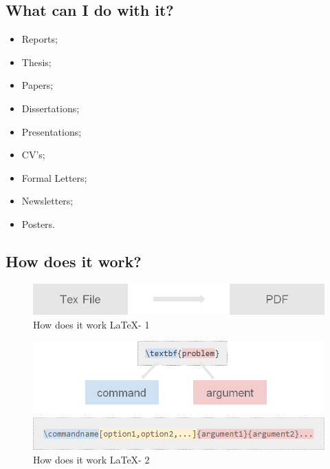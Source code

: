 \documentclass{article} %
\begin{document}
    
    \subsection{What can I do with it?}
           \begin{multicols}{2}
        \begin{itemize}
            \item Reports;
            \item Thesis;
            \item Papers; 
            \item Dissertations;
            \item Presentations;
            \item CV's;
            \item Formal Letters;
            \item Newsletters;
            \item Posters. 
        \end{itemize} 
        \end{multicols}
    
        \quad %
    \subsection{How does it work?}
    \begin{figure}[H]
        \centering
        \includegraphics[]{1.png}
        \caption{How does it work \LaTeX - 1}
        \label{fig:my_label}
    \end{figure}
        \begin{figure}[H]
        \centering
        \includegraphics[]{2.png}
        \caption{How does it work \LaTeX - 2}
        \label{fig:my_label}
    \end{figure}
    
\end{document}
